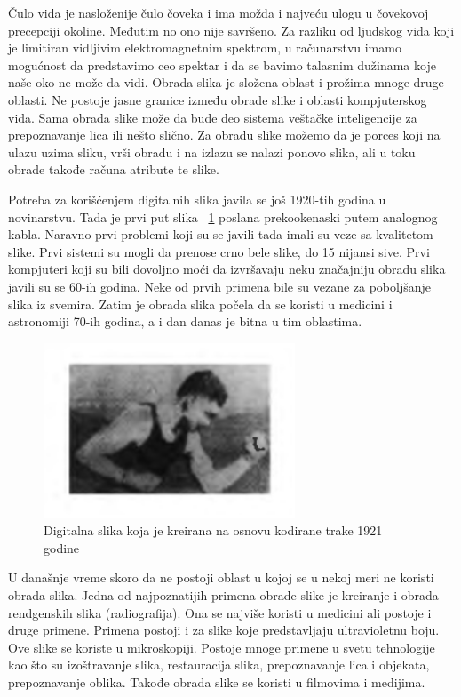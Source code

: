 \documentclass[a4paper,12pt,titlepage]{article}
\begin{document}
Čulo vida je nasloženije čulo čoveka i ima možda i najveću ulogu u čovekovoj precepciji okoline. Međutim no ono nije savršeno. Za razliku od ljudskog vida koji je limitiran vidljivim elektromagnetnim spektrom, u računarstvu imamo mogućnost da predstavimo ceo spektar i da se bavimo talasnim dužinama koje naše oko ne može da vidi. Obrada slika je složena oblast i prožima mnoge druge oblasti. Ne postoje jasne granice između obrade slike i oblasti kompjuterskog vida. Sama obrada slike može da bude deo sistema veštačke inteligencije za prepoznavanje lica ili nešto slično. Za obradu slike možemo da je porces koji na ulazu uzima sliku,   
vrši obradu i na izlazu se nalazi ponovo slika, ali u toku obrade takođe računa atribute te slike. 

Potreba za korišćenjem digitalnih slika javila se još 1920-tih godina u novinarstvu. Tada je prvi put slika ~\ref{slika1921} poslana prekookenaski putem analognog kabla. Naravno prvi problemi koji su se javili tada imali su veze sa kvalitetom slike. Prvi sistemi su mogli da prenose crno bele slike, do 15 nijansi sive. Prvi kompjuteri koji su bili dovoljno moći da izvršavaju neku značajniju obradu slika javili su se 60-ih godina. Neke od prvih primena bile su vezane za poboljšanje slika iz svemira. Zatim je obrada slika počela da se koristi u medicini i astronomiji 70-ih godina, a i dan danas je bitna u tim oblastima.

\begin{figure}[ht!]
\centering
\includegraphics[width=75mm]{img/prvaPrenesenaSlika.png}
\caption{Digitalna slika koja je kreirana na osnovu kodirane trake 1921 godine}
\label{slika1921}
\end{figure} 

U današnje vreme skoro da ne postoji oblast u kojoj se u nekoj meri ne koristi obrada slika. Jedna od najpoznatijih primena obrade slike je kreiranje i obrada rendgenskih slika (radiografija). Ona se najviše koristi u medicini ali postoje i druge primene. Primena postoji i za slike koje predstavljaju ultravioletnu boju. Ove slike se koriste u mikroskopiji. Postoje mnoge primene u svetu tehnologije kao što su izoštravanje slika, restauracija slika, prepoznavanje lica i objekata, prepoznavanje oblika. Takođe obrada slike se koristi u filmovima i medijima.  
\end{document}
